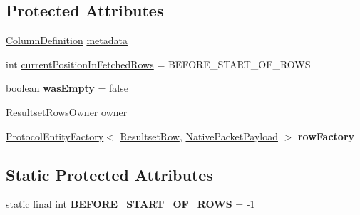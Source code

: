 \subsection*{Protected Attributes}
\begin{DoxyCompactItemize}
\item 
\mbox{\hyperlink{interfacecom_1_1mysql_1_1cj_1_1protocol_1_1_column_definition}{Column\+Definition}} \mbox{\hyperlink{classcom_1_1mysql_1_1cj_1_1protocol_1_1a_1_1result_1_1_abstract_resultset_rows_a6198167d21b19a82cb1191eaf226cad2}{metadata}}
\item 
int \mbox{\hyperlink{classcom_1_1mysql_1_1cj_1_1protocol_1_1a_1_1result_1_1_abstract_resultset_rows_ab6b652ef15f4d82cb9048d951bf1f82c}{current\+Position\+In\+Fetched\+Rows}} = B\+E\+F\+O\+R\+E\+\_\+\+S\+T\+A\+R\+T\+\_\+\+O\+F\+\_\+\+R\+O\+WS
\item 
\mbox{\label{classcom_1_1mysql_1_1cj_1_1protocol_1_1a_1_1result_1_1_abstract_resultset_rows_a345210cb918e444becdccda3d38f72a8}} 
boolean {\bfseries was\+Empty} = false
\item 
\mbox{\hyperlink{interfacecom_1_1mysql_1_1cj_1_1protocol_1_1_resultset_rows_owner}{Resultset\+Rows\+Owner}} \mbox{\hyperlink{classcom_1_1mysql_1_1cj_1_1protocol_1_1a_1_1result_1_1_abstract_resultset_rows_ac0fe5a90927b98441be0c579daefbf7f}{owner}}
\item 
\mbox{\label{classcom_1_1mysql_1_1cj_1_1protocol_1_1a_1_1result_1_1_abstract_resultset_rows_a97429d9b79ecd07252a5c1434fd7c1a4}} 
\mbox{\hyperlink{interfacecom_1_1mysql_1_1cj_1_1protocol_1_1_protocol_entity_factory}{Protocol\+Entity\+Factory}}$<$ \mbox{\hyperlink{interfacecom_1_1mysql_1_1cj_1_1protocol_1_1_resultset_row}{Resultset\+Row}}, \mbox{\hyperlink{classcom_1_1mysql_1_1cj_1_1protocol_1_1a_1_1_native_packet_payload}{Native\+Packet\+Payload}} $>$ {\bfseries row\+Factory}
\end{DoxyCompactItemize}
\subsection*{Static Protected Attributes}
\begin{DoxyCompactItemize}
\item 
\mbox{\label{classcom_1_1mysql_1_1cj_1_1protocol_1_1a_1_1result_1_1_abstract_resultset_rows_a94be6a28f1ebe4c8bfe5b4907dc44083}} 
static final int {\bfseries B\+E\+F\+O\+R\+E\+\_\+\+S\+T\+A\+R\+T\+\_\+\+O\+F\+\_\+\+R\+O\+WS} = -\/1
\end{DoxyCompactItemize}
